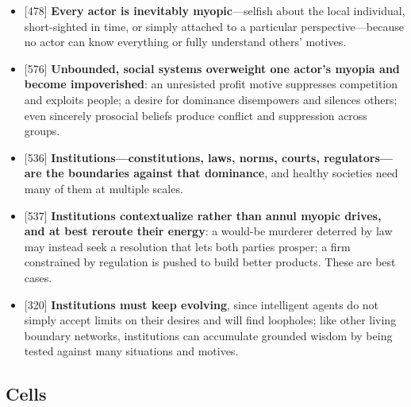 \documentclass[11pt]{article}
\newcommand{\ct}[1]{{\footnotesize\color{black!55}[#1]}\hspace{1pt}}
\begin{document}
\begin{itemize}
  \item \ct{478} \textbf{Every actor is inevitably myopic}---selfish about the local individual, short-sighted in time, or simply attached to a particular perspective---because no actor can know everything or fully understand others' motives.
  \item \ct{576} \textbf{Unbounded, social systems overweight one actor's myopia and become impoverished}: an unresisted profit motive suppresses competition and exploits people; a desire for dominance disempowers and silences others; even sincerely prosocial beliefs produce conflict and suppression across groups.
  \item \ct{536} \textbf{Institutions---constitutions, laws, norms, courts, regulators---are the boundaries against that dominance}, and healthy societies need many of them at multiple scales.
  \item \ct{537} \textbf{Institutions contextualize rather than annul myopic drives, and at best reroute their energy}: a would-be murderer deterred by law may instead seek a resolution that lets both parties prosper; a firm constrained by regulation is pushed to build better products. These are best cases.
  \item \ct{320} \textbf{Institutions must keep evolving}, since intelligent agents do not simply accept limits on their desires and will find loopholes; like other living boundary networks, institutions can accumulate grounded wisdom by being tested against many situations and motives.
\end{itemize}

\subsection{Cells}
\end{document}
